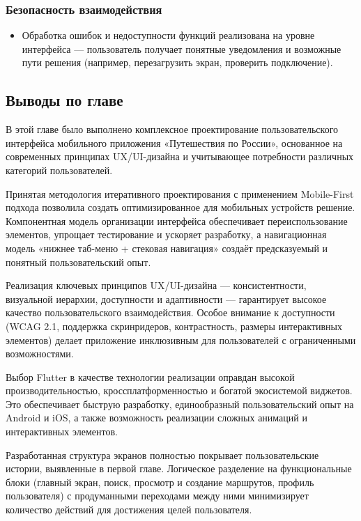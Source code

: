 \subsubsection*{Безопасность взаимодействия}
\begin{itemize}
    \item Обработка ошибок и недоступности функций реализована на уровне интерфейса — пользователь получает понятные уведомления и возможные пути решения (например, перезагрузить экран, проверить подключение).
\end{itemize}

\subsection*{Выводы по главе}
В этой главе было выполнено комплексное проектирование пользовательского интерфейса мобильного приложения «Путешествия по России», основанное на современных принципах UX/UI-дизайна и учитывающее потребности различных категорий пользователей.

Принятая методология итеративного проектирования с применением Mobile-First подхода позволила создать оптимизированное для мобильных устройств решение. Компонентная модель организации интерфейса обеспечивает переиспользование элементов, упрощает тестирование и ускоряет разработку, а навигационная модель «нижнее таб-меню + стековая навигация» создаёт предсказуемый и понятный пользовательский опыт.

Реализация ключевых принципов UX/UI-дизайна — консистентности, визуальной иерархии, доступности и адаптивности — гарантирует высокое качество пользовательского взаимодействия. Особое внимание к доступности (WCAG 2.1, поддержка скринридеров, контрастность, размеры интерактивных элементов) делает приложение инклюзивным для пользователей с ограниченными возможностями.

Выбор Flutter в качестве технологии реализации оправдан высокой производительностью, кроссплатформенностью и богатой экосистемой виджетов. Это обеспечивает быструю разработку, единообразный пользовательский опыт на Android и iOS, а также возможность реализации сложных анимаций и интерактивных элементов.

Разработанная структура экранов полностью покрывает пользовательские истории, выявленные в первой главе. Логическое разделение на функциональные блоки (главный экран, поиск, просмотр и создание маршрутов, профиль пользователя) с продуманными переходами между ними минимизирует количество действий для достижения целей пользователя.

